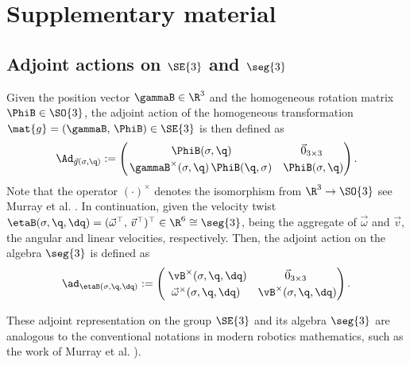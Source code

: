 \section{Supplementary material}
\subsection{Adjoint actions on $\SE{3}$ and $\seg{3}$} 
\label{app:C2:adjoint}  
\noindent Given the position vector $\gammaB \in \R^3$ and the homogeneous rotation matrix $\PhiB \in \SO{3}$, the adjoint action of the homogeneous transformation $\mat{g} = (\gammaB,\,\PhiB) \in \SE{3}$ is then defined as
%
\begin{equation}
\renewcommand*{\arraystretch}{1.25}{}
\Ad_{\vec{g}(\sigma,\q)} := \begin{pmatrix}
\; {\PhiB}(\sigma,\q) & \vec{0}_{3\times3} \; \\
\hspace{0.5mm} \gammaB^{\times}(\sigma,{\q})\,{\PhiB}({\q},\sigma) & {\PhiB}(\sigma,{\q})
\end{pmatrix}. 
\label{eq:C2:adjoint_matrix}
\end{equation}
%
Note that the operator $(\cdot)^\times$ denotes the isomorphism from $\R^3 \to \SO{3}$ see Murray et al. \cite{Murray1994}. In continuation, given the velocity twist $\etaB(\sigma,\q,\dq) = (\vec{\omega}^\top,\,\vec{v}^\top)^\top \in \R^6 \cong \seg{3}$, being the aggregate of $\vec{\omega}$ and $\vec{v}$, the angular and linear velocities, respectively. Then, the adjoint action on the algebra $\seg{3}$ is defined as
%
\begin{equation}
\renewcommand*{\arraystretch}{1.25}{}
\ad_{\etaB(\sigma,\q,\dq)} := \begin{pmatrix}
\; \vB^{\times}(\sigma,\q,\dq) & \vec{0}_{3\times3} \; \\
 \vec{\omega}^{\times}(\sigma,\q,\dq) & \vB^{\times} (\sigma,\q,\dq)
\end{pmatrix}. 
\label{eq:C2:adjoint_matrix_algebra}
\end{equation}
%

\noindent These adjoint representation on the group $\SE{3}$ and its algebra $\seg{3}$ are analogous to the conventional notations in modern robotics mathematics, such as the work of Murray et al. \cite{Murray1994}).


